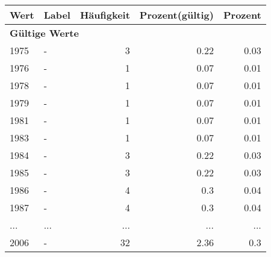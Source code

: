      \begin{longtable}{lXrrr}
     \toprule
     \textbf{Wert} & \textbf{Label} & \textbf{Häufigkeit} & \textbf{Prozent(gültig)} & \textbf{Prozent} \\
     \endhead
     \midrule
     \multicolumn{5}{l}{\textbf{Gültige Werte}}\\
        1975 & \multicolumn{1}{X}{-} & %
          \num{3} &
          \num[round-mode=places,round-precision=2]{0.22} &
          \num[round-mode=places,round-precision=2]{0.03} \\
        1976 & \multicolumn{1}{X}{-} & %
          \num{1} &
          \num[round-mode=places,round-precision=2]{0.07} &
          \num[round-mode=places,round-precision=2]{0.01} \\
        1978 & \multicolumn{1}{X}{-} & %
          \num{1} &
          \num[round-mode=places,round-precision=2]{0.07} &
          \num[round-mode=places,round-precision=2]{0.01} \\
        1979 & \multicolumn{1}{X}{-} & %
          \num{1} &
          \num[round-mode=places,round-precision=2]{0.07} &
          \num[round-mode=places,round-precision=2]{0.01} \\
        1981 & \multicolumn{1}{X}{-} & %
          \num{1} &
          \num[round-mode=places,round-precision=2]{0.07} &
          \num[round-mode=places,round-precision=2]{0.01} \\
        1983 & \multicolumn{1}{X}{-} & %
          \num{1} &
          \num[round-mode=places,round-precision=2]{0.07} &
          \num[round-mode=places,round-precision=2]{0.01} \\
        1984 & \multicolumn{1}{X}{-} & %
          \num{3} &
          \num[round-mode=places,round-precision=2]{0.22} &
          \num[round-mode=places,round-precision=2]{0.03} \\
        1985 & \multicolumn{1}{X}{-} & %
          \num{3} &
          \num[round-mode=places,round-precision=2]{0.22} &
          \num[round-mode=places,round-precision=2]{0.03} \\
        1986 & \multicolumn{1}{X}{-} & %
          \num{4} &
          \num[round-mode=places,round-precision=2]{0.3} &
          \num[round-mode=places,round-precision=2]{0.04} \\
        1987 & \multicolumn{1}{X}{-} & %
          \num{4} &
          \num[round-mode=places,round-precision=2]{0.3} &
          \num[round-mode=places,round-precision=2]{0.04} \\
       ... & ... & ... & ... & ... \\
        2006 & \multicolumn{1}{X}{-} & %
          \num{32} &
          \num[round-mode=places,round-precision=2]{2.36} &
          \num[round-mode=places,round-precision=2]{0.3} \\


\end{longtable}
